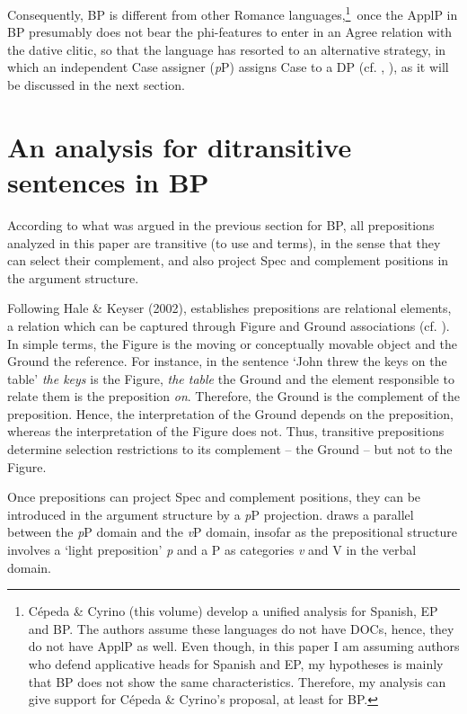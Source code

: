 \documentclass[output=paper,colorlinks,citecolor=brown]{./langscibook}
\begin{document}
Consequently, BP is different from other Romance languages,\footnote{Cépeda \& Cyrino (this volume) develop a unified analysis for Spanish, EP and BP. The authors assume these languages do not have DOCs, hence, they do not have ApplP as well. Even though, in this paper I am assuming authors who defend applicative heads for Spanish and EP, my hypotheses is mainly that BP does not show the same characteristics. Therefore, my analysis can give support for Cépeda \& Cyrino’s proposal, at least for BP.}~once the ApplP in BP presumably does not bear the phi-features to enter in an Agree relation with the dative clitic, so that the language has resorted to an alternative strategy, in which an independent Case assigner (\textit{p}P) assigns Case to a DP (cf. \citealt{Calindro2015}, \citeyear{Calindro2016}), as it will be discussed in the next section. 

\section{An analysis for ditransitive sentences in BP}\label{sec:calindro:3}

According to what was argued in the previous section for BP, all prepositions analyzed in this paper are transitive (to use \citealt{Svenonius2004Arguments} and \citealt{Cuervo2010Probus} terms), in the sense that they can select their complement, and also project Spec and complement positions in the argument structure.

Following Hale \& Keyser (2002), \citet{Svenonius2004Arguments} establishes prepositions are relational elements, a relation which can be captured through Figure and Ground associations (cf. \citealt{Talmy1978}). In simple terms, the Figure is the moving or conceptually movable object and the Ground the reference. For instance, in the sentence ‘John threw the keys on the table’ \textit{the keys} is the Figure, \textit{the table} the Ground and the element responsible to relate them is the preposition \textit{on}. Therefore, the Ground is the complement of the preposition. Hence, the interpretation of the Ground depends on the preposition, whereas the interpretation of the Figure does not. Thus, transitive prepositions determine selection restrictions to its complement – the Ground – but not to the Figure.

Once prepositions can project Spec and complement positions, they can be introduced in the argument structure by a \textit{p}P projection. \citet[180]{Wood2012} draws a parallel between the \textit{p}P domain and the \textit{v}P domain, insofar as the prepositional structure involves a ‘light preposition’ \textit{p} and a P as categories \textit{v} and V in the verbal domain.
\end{document}
